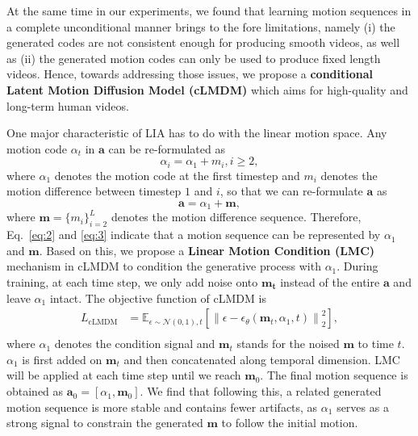 {At the same time in our experiments, we found that learning motion sequences in a complete unconditional manner brings to the fore limitations, namely (i) the generated codes are not consistent enough for producing smooth videos, as well as (ii) the generated motion codes can only be used to produce fixed length videos. Hence, towards addressing those issues, we propose a \textbf{conditional Latent Motion Diffusion Model (cLMDM)} which aims for high-quality and long-term human videos.    

One major characteristic of LIA has to do with the linear motion space. Any motion code $\alpha_t$ in $\mathbf{a}$ can be re-formulated as
\begin{equation}\label{eq:2}
    \alpha_{i} = \alpha_{1} + m_{i}, i\ge 2,
\end{equation}
where $\alpha_{1}$ denotes the motion code at the first timestep and $m_{i}$ denotes the motion difference between timestep $1$ and $i$, so that we can re-formulate $\mathbf{a}$ as
\begin{equation}\label{eq:3}
    \mathbf{a} = \alpha_{1} + \mathbf{m},
\end{equation}
where $\mathbf{m}=\{m_i\}^{L}_{i=2}$ denotes the motion difference sequence. Therefore, Eq.~\ref{eq:2} and \ref{eq:3} indicate that a motion sequence can be represented by $\alpha_{1}$ and $\mathbf{m}$. Based on this, we propose a \textbf{Linear Motion Condition (LMC)} mechanism in cLMDM to condition the generative process with $\alpha_1$. During training, at each time step, we only add noise onto $\mathbf{m_t}$ instead of the entire $\mathbf{a}$ and leave $\alpha_1$ intact. The objective function of cLMDM is
\begin{equation}
\begin{split}
    L_{\text{cLMDM}} &= \mathbb{E}_{\epsilon \sim \mathcal{N} (0,1), t}\left [ \left \| \epsilon - \epsilon_{\theta}(\mathbf{m}_{t}, \alpha_1, t)\right \|^{2}_{2}\right], \\
\end{split}
\end{equation}
where $\alpha_{1}$ denotes the condition signal and $\mathbf{m}_t$ stands for the noised $\mathbf{m}$ to time $t$. $\alpha_1$ is first added on $\mathbf{m}_t$ and then concatenated along temporal dimension. LMC will be applied at each time step until we reach $\mathbf{m}_0$. The final motion sequence is obtained as $\mathbf{a}_0 = [\alpha_1, \mathbf{m}_0]$. We find that following this, a related generated motion sequence is more stable and contains fewer artifacts, as $\alpha_1$ serves as a strong signal to constrain the generated $\mathbf{m}$ to follow the initial motion. 

}
